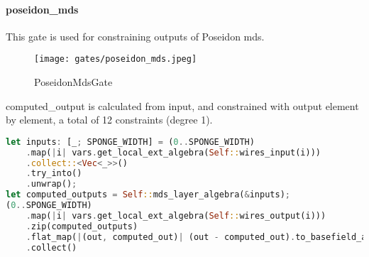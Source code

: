 \paragraph{poseidon\_mds}

This gate is used for constraining outputs of Poseidon mds.

\begin{figure}[!ht]
    \centering
    \texttt{[image: gates/poseidon\_mds.jpeg]}
    \caption{PoseidonMdsGate}
    \label{fig:poseidon-mds}
\end{figure}

computed\_output is calculated from input, and constrained with output element by element, a total of 12 constraints (degree 1).
\begin{lstlisting}[language=rust]
let inputs: [_; SPONGE_WIDTH] = (0..SPONGE_WIDTH)
    .map(|i| vars.get_local_ext_algebra(Self::wires_input(i)))
    .collect::<Vec<_>>()
    .try_into()
    .unwrap();
let computed_outputs = Self::mds_layer_algebra(&inputs);
(0..SPONGE_WIDTH)
    .map(|i| vars.get_local_ext_algebra(Self::wires_output(i)))
    .zip(computed_outputs)
    .flat_map(|(out, computed_out)| (out - computed_out).to_basefield_array())
    .collect()
\end{lstlisting}
